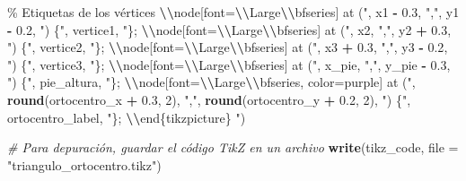 \documentclass[
]{article}
\newenvironment{Shaded}{\begin{snugshade}}{\end{snugshade}}
\newcommand{\AttributeTok}[1]{\textcolor[rgb]{0.13,0.29,0.53}{#1}}
\newcommand{\CommentTok}[1]{\textcolor[rgb]{0.56,0.35,0.01}{\textit{#1}}}
\newcommand{\DecValTok}[1]{\textcolor[rgb]{0.00,0.00,0.81}{#1}}
\newcommand{\FloatTok}[1]{\textcolor[rgb]{0.00,0.00,0.81}{#1}}
\newcommand{\FunctionTok}[1]{\textcolor[rgb]{0.13,0.29,0.53}{\textbf{#1}}}
\newcommand{\NormalTok}[1]{#1}
\newcommand{\SpecialCharTok}[1]{\textcolor[rgb]{0.81,0.36,0.00}{\textbf{#1}}}
\newcommand{\StringTok}[1]{\textcolor[rgb]{0.31,0.60,0.02}{#1}}
\begin{document}
\begin{Shaded}
\begin{Highlighting}[]
\StringTok{  \% Etiquetas de los vértices}
\StringTok{  }\SpecialCharTok{\textbackslash{}\textbackslash{}}\StringTok{node[font=}\SpecialCharTok{\textbackslash{}\textbackslash{}}\StringTok{Large}\SpecialCharTok{\textbackslash{}\textbackslash{}}\StringTok{bfseries] at ("}\NormalTok{, x1 }\SpecialCharTok{{-}} \FloatTok{0.3}\NormalTok{, }\StringTok{","}\NormalTok{, y1 }\SpecialCharTok{{-}} \FloatTok{0.2}\NormalTok{, }\StringTok{") \{"}\NormalTok{, vertice1, }\StringTok{"\};}
\StringTok{  }\SpecialCharTok{\textbackslash{}\textbackslash{}}\StringTok{node[font=}\SpecialCharTok{\textbackslash{}\textbackslash{}}\StringTok{Large}\SpecialCharTok{\textbackslash{}\textbackslash{}}\StringTok{bfseries] at ("}\NormalTok{, x2, }\StringTok{","}\NormalTok{, y2 }\SpecialCharTok{+} \FloatTok{0.3}\NormalTok{, }\StringTok{") \{"}\NormalTok{, vertice2, }\StringTok{"\};}
\StringTok{  }\SpecialCharTok{\textbackslash{}\textbackslash{}}\StringTok{node[font=}\SpecialCharTok{\textbackslash{}\textbackslash{}}\StringTok{Large}\SpecialCharTok{\textbackslash{}\textbackslash{}}\StringTok{bfseries] at ("}\NormalTok{, x3 }\SpecialCharTok{+} \FloatTok{0.3}\NormalTok{, }\StringTok{","}\NormalTok{, y3 }\SpecialCharTok{{-}} \FloatTok{0.2}\NormalTok{, }\StringTok{") \{"}\NormalTok{, vertice3, }\StringTok{"\};}
\StringTok{  }\SpecialCharTok{\textbackslash{}\textbackslash{}}\StringTok{node[font=}\SpecialCharTok{\textbackslash{}\textbackslash{}}\StringTok{Large}\SpecialCharTok{\textbackslash{}\textbackslash{}}\StringTok{bfseries] at ("}\NormalTok{, x\_pie, }\StringTok{","}\NormalTok{, y\_pie }\SpecialCharTok{{-}} \FloatTok{0.3}\NormalTok{, }\StringTok{") \{"}\NormalTok{, pie\_altura, }\StringTok{"\};}
\StringTok{  }\SpecialCharTok{\textbackslash{}\textbackslash{}}\StringTok{node[font=}\SpecialCharTok{\textbackslash{}\textbackslash{}}\StringTok{Large}\SpecialCharTok{\textbackslash{}\textbackslash{}}\StringTok{bfseries, color=purple] at ("}\NormalTok{, }\FunctionTok{round}\NormalTok{(ortocentro\_x }\SpecialCharTok{+} \FloatTok{0.3}\NormalTok{, }\DecValTok{2}\NormalTok{), }\StringTok{","}\NormalTok{, }\FunctionTok{round}\NormalTok{(ortocentro\_y }\SpecialCharTok{+} \FloatTok{0.2}\NormalTok{, }\DecValTok{2}\NormalTok{), }\StringTok{") \{"}\NormalTok{, ortocentro\_label, }\StringTok{"\};}
\SpecialCharTok{\textbackslash{}\textbackslash{}}\StringTok{end\{tikzpicture\}}
\StringTok{"}\NormalTok{)}

\CommentTok{\# Para depuración, guardar el código TikZ en un archivo}
\FunctionTok{write}\NormalTok{(tikz\_code, }\AttributeTok{file =} \StringTok{"triangulo\_ortocentro.tikz"}\NormalTok{)}
\end{Highlighting}
\end{Shaded}
\end{document}
